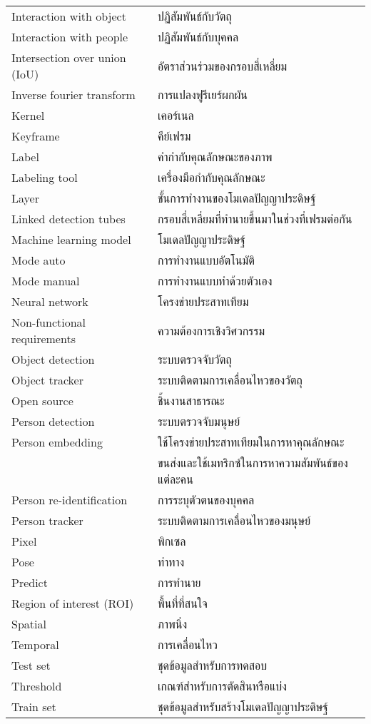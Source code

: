 \begin{abbreviations}
    \noindent
    \begin{tabular*}{\textwidth}{@{}p{}p{}@{}}
	Interaction with object  &  ปฏิสัมพันธ์กับวัตถุ\\
        Interaction with people & ปฏิสัมพันธ์กับบุคคล\\
	Intersection over union (IoU) & อัตราส่วนร่วมของกรอบสี่เหลี่ยม\\
	Inverse fourier transform & การแปลงฟูรีเยร์ผกผัน\\
	Kernel & เคอร์เนล\\
	Keyframe & คีย์เฟรม\\
	Label & คำกำกับคุณลักษณะของภาพ\\
	Labeling tool & เครื่องมือกำกับคุณลักษณะ\\
	Layer & ชั้นการทำงานของโมเดลปัญญาประดิษฐ์\\
	Linked detection tubes & กรอบสี่เหลี่ยมที่ทำนายขึ้นมาในช่วงที่เฟรมต่อกัน\\
	Machine learning model & โมเดลปัญญาประดิษฐ์\\
	Mode auto & การทำงานแบบอัตโนมัติ\\
	Mode manual & การทำงานแบบทำด้วยตัวเอง\\
	Neural network & โครงข่ายประสาทเทียม\\
	Non-functional requirements & ความต้องการเชิงวิศวกรรม\\
	Object detection & ระบบตรวจจับวัตถุ\\
	Object tracker & ระบบติดตามการเคลื่อนไหวของวัตถุ\\
	Open source & ชิ้นงานสาธารณะ\\
	Person detection & ระบบตรวจจับมนุษย์\\
	Person embedding & ใช้โครงข่ายประสาทเทียมในการหาคุณลักษณะ\\
				&ขนส่งและใช้เมทริกซ์ในการหาความสัมพันธ์ของแต่ละคน\\
	Person re-identification & การระบุตัวตนของบุคคล\\
	Person tracker & ระบบติดตามการเคลื่อนไหวของมนุษย์\\
	Pixel & พิกเซล\\
	Pose & ท่าทาง\\
	Predict & การทำนาย\\
	Region of interest (ROI) & พื้นที่ที่สนใจ\\
	Spatial & ภาพนิ่ง\\
	Temporal & การเคลื่อนไหว\\
	Test set & ชุดข้อมูลสำหรับการทดสอบ\\
        Threshold & เกณฑ์สำหรับการตัดสินหรือแบ่ง\\
	Train set & ชุดข้อมูลสำหรับสร้างโมเดลปัญญาประดิษฐ์\\
    \end{tabular*}
\end{abbreviations}

